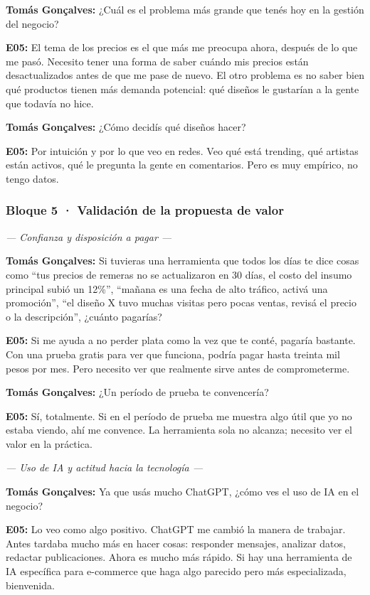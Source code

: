 \noindent\textbf{Tomás Gonçalves:} ¿Cuál es el problema más grande que tenés hoy en la gestión del negocio?

\noindent\textbf{E05:} El tema de los precios es el que más me preocupa ahora, después de lo que me pasó. Necesito tener una forma de saber cuándo mis precios están desactualizados antes de que me pase de nuevo. El otro problema es no saber bien qué productos tienen más demanda potencial: qué diseños le gustarían a la gente que todavía no hice.

\noindent\textbf{Tomás Gonçalves:} ¿Cómo decidís qué diseños hacer?

\noindent\textbf{E05:} Por intuición y por lo que veo en redes. Veo qué está trending, qué artistas están activos, qué le pregunta la gente en comentarios. Pero es muy empírico, no tengo datos.

\subsubsection*{Bloque 5 · Validación de la propuesta de valor}

\noindent\textit{--- Confianza y disposición a pagar ---}

\noindent\textbf{Tomás Gonçalves:} Si tuvieras una herramienta que todos los días te dice cosas como ``tus precios de remeras no se actualizaron en 30 días, el costo del insumo principal subió un 12\%'', ``mañana es una fecha de alto tráfico, activá una promoción'', ``el diseño X tuvo muchas visitas pero pocas ventas, revisá el precio o la descripción'', ¿cuánto pagarías?

\noindent\textbf{E05:} Si me ayuda a no perder plata como la vez que te conté, pagaría bastante. Con una prueba gratis para ver que funciona, podría pagar hasta treinta mil pesos por mes. Pero necesito ver que realmente sirve antes de comprometerme.

\noindent\textbf{Tomás Gonçalves:} ¿Un período de prueba te convencería?

\noindent\textbf{E05:} Sí, totalmente. Si en el período de prueba me muestra algo útil que yo no estaba viendo, ahí me convence. La herramienta sola no alcanza; necesito ver el valor en la práctica.

\noindent\textit{--- Uso de IA y actitud hacia la tecnología ---}

\noindent\textbf{Tomás Gonçalves:} Ya que usás mucho ChatGPT, ¿cómo ves el uso de IA en el negocio?

\noindent\textbf{E05:} Lo veo como algo positivo. ChatGPT me cambió la manera de trabajar. Antes tardaba mucho más en hacer cosas: responder mensajes, analizar datos, redactar publicaciones. Ahora es mucho más rápido. Si hay una herramienta de IA específica para e-commerce que haga algo parecido pero más especializada, bienvenida.

